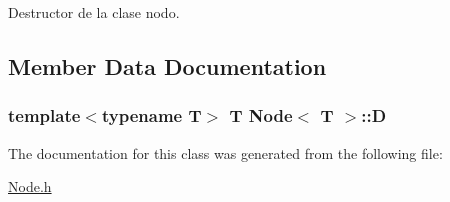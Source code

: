 Destructor de la clase nodo. 



\subsection{Member Data Documentation}
\hypertarget{class_node_ade05a452f3fc4e823b9cdc940546e644}{
\subsubsection[{D}]{\setlength{\rightskip}{0pt plus 5cm}template$<$typename T$>$ T {\bf Node}$<$ T $>$\+::D}}\label{class_node_ade05a452f3fc4e823b9cdc940546e644}


The documentation for this class was generated from the following file\+:\begin{DoxyCompactItemize}
\item 
\hyperlink{_node_8h}{Node.\+h}\end{DoxyCompactItemize}
